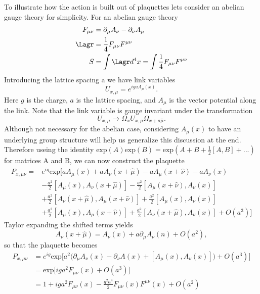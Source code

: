 To illustrate how the action is built out of plaquettes lets consider an abelian gauge theory for simplicity.
For an abelian gauge theory
\begin{align}
  F_{\mu\nu} &= \partial_\mu A_\nu-\partial_\nu A_\mu \\
  \Lagr &= \frac{1}{4}F_{\mu\nu}F^{\mu\nu} \\
  S &= \int \Lagr d^4x = \int  \frac{1}{4}F_{\mu\nu}F^{\mu\nu}
\end{align}
Introducing the lattice spacing a we have link variables
\begin{equation}
  U_{x,\mu}= e^{igaA_\mu(x)}.
\end{equation}
Here $g$ is the charge, $a$ is the lattice spacing, and $A_\mu$ is the vector potential along the link.
Note that the link variable is gauge invariant under the transformation
\begin{equation}
  U_{x,\mu}\rightarrow \Omega_x U_{x,\mu} \Omega_{x+a\hat{\mu}}.
\end{equation}
Although not necessary for the abelian case, considering $A_\mu(x)$ to have an underlying group structure will help us generalize this discussion at the end.
Therefore useing the identity $\mbox{exp}(A)\mbox{exp}(B)=\mbox{exp}(A+B+\frac{1}{2}[A,B]+...)$ for matrices A and B, we can now construct the plaquette
\begin{equation}
  \begin{aligned}
    P_{x,\mu\nu}=&e^{ig}\mbox{exp}\Big[aA_\mu(x)+aA_\nu(x+\hat{\mu})-aA_\mu(x+\hat{\nu})-aA_\nu(x) \\
                 &-\frac{a^2}{2}[A_\mu(x),A_\nu(x+\hat{\mu})]-\frac{a^2}{2}[A_\mu(x+\hat{\nu}),A_\nu(x)] \\
                 &+\frac{a^2}{2}[A_\nu(x+\hat{\mu}),A_\mu(x+\hat{\nu})] + \frac{a^2}{2}[A_\mu(x),A_\nu(x)] \\
                 &+\frac{a^2}{2}[A_\mu(x),A_\mu(x+\hat{\nu})]+\frac{a^2}{2}[A_\nu(x+\hat{\mu}),A_\nu(x)]+O(a^3)\Big]
  \end{aligned}
\end{equation}
Taylor expanding the shifted terms yields
\begin{equation}
  A_\nu(x+\hat{\mu})=A_\nu(x)+a\partial_\mu A_\nu(n)+O(a^2),
\end{equation}
so that the plaquette becomes
\begin{equation}
  \begin{aligned}
  P_{x,\mu\nu}&=e^{ig}\mbox{exp}\Big[a^2\big(\partial_\mu A_\nu(x)-\partial_\nu A(x) + [A_\mu(x),A_\nu(x)]\big)+O(a^3)\Big] \\
              &=\mbox{exp}\Big[iga^2F_{\mu\nu}(x)+O(a^3)\Big]  \\
              &=1+iga^2F_{\mu\nu}(x)-\frac{g^2a^4}{2}F_{\mu\nu}(x)F^{\mu\nu}(x) + O(a^2)
  \end{aligned}
\end{equation}
